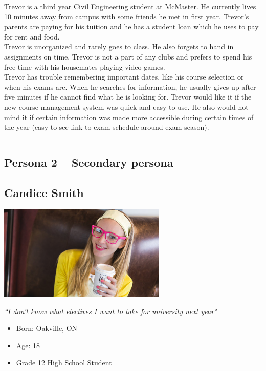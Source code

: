 \documentclass[12pt]{article}
\begin{document}
Trevor is a third year Civil Engineering student at McMaster. He currently lives 10 minutes away from campus with some friends he met in first year. Trevor's parents are paying for his tuition and he has a student loan which he uses to pay for rent and food.\\

Trevor is unorganized and rarely goes to class. He also forgets to hand in assignments on time. Trevor is not a part of any clubs and prefers to spend his free time with his housemates playing video games.\\

Trevor has trouble remembering important dates, like his course selection or when his exams are. When he searches for information, he usually gives up after five minutes if he cannot find what he is looking for. Trevor would like it if the new course management system was quick and easy to use. He also would not mind it if certain information was made more accessible during certain times of the year (easy to see link to exam schedule around exam season).

\newpage
\hrule
\vspace{2mm}
\subsection{Persona 2 -- Secondary persona}
\vspace{11mm}

\subsection*{Candice Smith}
\vspace{4mm}

\begin{minipage}{80mm}
\includegraphics[width=80mm]{Candice.jpg}
\begin{center}
\emph{``I don't know what electives I want to take for university next year"}
\end{center}
\end{minipage} \hfill
\begin{minipage}{\textwidth}
\begin{itemize}
\item Born: Oakville, ON
\item Age: 18
\item Grade 12 High School Student
\end{itemize}
\end{minipage}\\\\\\
\end{document}
